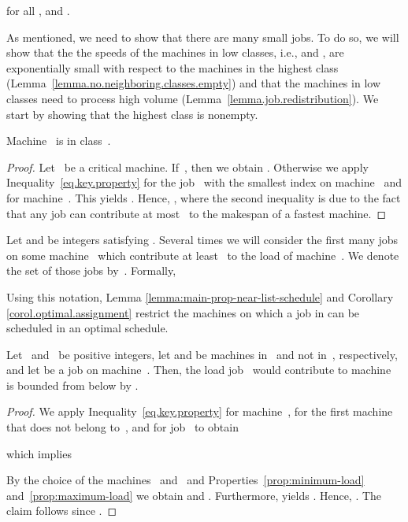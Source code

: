 \documentclass[a4paper,11pt,fleqn]{article}
\begin{document}
\begin{property}
\label{prop:maximum-load}
 for all , and .
\end{property}

As mentioned, we need to show that there are many small jobs. To do so,
we will show that the the speeds of the machines in low classes, i.e.,  and
, are exponentially small with respect to the machines in the
highest class  (Lemma~\ref{lemma.no.neighboring.classes.empty})
and that the machines in low classes
need to process high volume (Lemma~\ref{lemma.job.redistribution}).
We start by showing that the highest class is nonempty.

\begin{lemma}
\label{lem:nonemptyHc}
Machine~ is in class~.
\end{lemma}

\begin{proof}
Let~ be a critical machine. If~, then we obtain . Otherwise we apply Inequality~\eqref{eq.key.property} for the job~ with the smallest index on machine~ and for machine~. This yields . Hence,
,
where the second inequality is due to the fact that any job can
contribute at most~ to the makespan of a fastest machine.
\end{proof}

Let  and  be integers satisfying . Several times we will consider the first many jobs 
on some machine~ which contribute at least~ to the load of machine~. We denote the set of those jobs
by~. Formally, 

Using this notation, Lemma \ref{lemma:main-prop-near-list-schedule} and Corollary \ref{corol.optimal.assignment} restrict the machines on which a job in  can be scheduled in an optimal schedule.

\begin{lemma}
\label{lemma:main-prop-near-list-schedule}
Let~ and~ be positive integers, let  and  be  machines in~ and not in~, respectively, and let  be a job on machine~. Then, the load job~ would contribute to machine~ is bounded from below by .
\end{lemma}

\begin{proof}
We apply Inequality~\eqref{eq.key.property} for machine~, for the first machine~ that does not belong to~, and for job~ to obtain

which implies

By the choice of the machines~ and~ and Properties~\ref{prop:minimum-load} and~\ref{prop:maximum-load} we obtain  and . Furthermore,  yields . Hence, . The claim follows since .
\end{proof}
\end{document}
